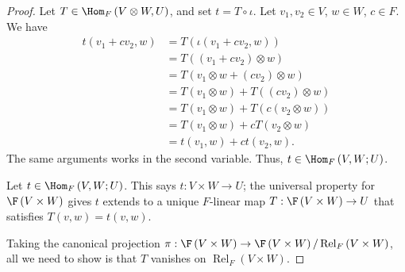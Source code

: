 \documentclass[10pt]{mypackage}
\begin{document}
  \begin{proof}
    Let $T\in \Hom_{F}\left(V\otimes W,U\right)$, and set $t = T\circ \iota$. Let $v_1,v_2\in V$, $w\in W$, $c\in F$. We have
    \begin{align*}
      t\left(v_1+cv_2,w\right) &= T\left(\iota\left(v_1 + cv_2,w\right)\right)\\
                               &= T\left(\left(v_1 + cv_2\right)\otimes w\right)\\
                               &= T\left(v_1\otimes w + \left(cv_2\right)\otimes w\right)\\
                               &= T\left(v_1\otimes w\right) + T\left(\left(cv_2\right)\otimes w\right)\\
                               &= T\left(v_1\otimes w\right) + T\left(c\left(v_2 \otimes w\right)\right)\\
                               &= T\left(v_1\otimes w\right) + cT\left(v_2\otimes w\right)\\
                               &= t\left(v_1,w\right) + ct\left(v_2,w\right).
    \end{align*}
    The same arguments works in the second variable. Thus, $t\in \Hom_{F}\left(V,W;U\right)$.\newline

    Let $t\in \Hom_{F}\left(V,W;U\right)$. This says $t: V\times W\rightarrow U$; the universal property for $\F\left(V\times W\right)$ gives $t$ extends to a unique $F$-linear map $T: \F\left(V\times W\right)\rightarrow U$ that satisfies $T\left(v,w\right) = t\left(v,w\right)$.\newline

    Taking the canonical projection $\pi: \F\left(V\times W\right) \rightarrow \F\left(V\times W\right)/\operatorname{Rel}_{F}\left(V\times W\right)$, all we need to show is that $T$ vanishes on $\operatorname{Rel}_{F}\left(V\times W\right)$.\newline


\end{proof}
\end{document}
